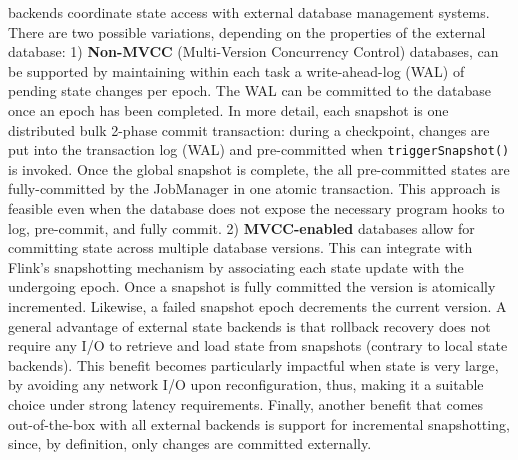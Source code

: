  backends coordinate state access with external database management systems. There are two possible variations, depending on the properties of the external database: 1) \textbf{Non-MVCC} (Multi-Version Concurrency Control) databases, can be supported by maintaining within each task a write-ahead-log (WAL) of pending state changes per epoch. The WAL can be committed to the database once an epoch has been completed. In more detail, each snapshot is one distributed bulk 2-phase commit transaction: during a checkpoint, changes are put into the transaction log (WAL) and pre-committed when \texttt{triggerSnapshot()} is invoked. Once the global snapshot is complete, the all pre-committed states are fully-committed by the JobManager in one atomic transaction. This approach is feasible even when the database does not expose the necessary program hooks to log, pre-commit, and fully commit.
 2) \textbf{MVCC-enabled} databases allow for committing state across multiple database versions. This can integrate with Flink's snapshotting mechanism by associating each state update with the undergoing epoch. Once a snapshot is fully committed the version is atomically incremented. Likewise, a failed snapshot epoch decrements the current version. A general advantage of external state backends is that rollback recovery does not require any I/O to retrieve and load state from snapshots (contrary to local state backends). This benefit becomes particularly impactful when state is very large, by avoiding any network I/O upon reconfiguration, thus, making it a suitable choice under strong latency requirements. Finally, another benefit that comes out-of-the-box with all external backends is support for incremental snapshotting, since, by definition, only changes are committed externally.
 


